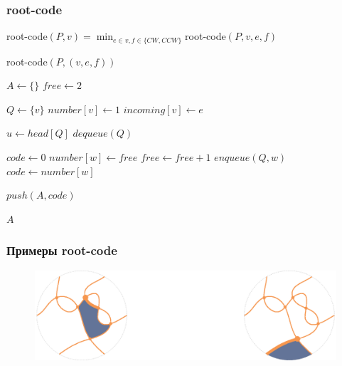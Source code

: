 \documentclass[dvips, intlimits, 9pt, unicode, notheorems, color=usenames,dvipsnames]{beamer}
\theoremstyle{plain}
\theoremstyle{definition}
\begin{document}
	\begin{frame}
		\frametitle{root-code}

		root-code$(P, v) = \min_{e \in v, f \in \{CW, CCW\} } $root-code$(P, v, e, f)$

		\begin{block}{root-code$(P, (v, e, f))$}
		{
			\footnotesize
			\begin{algorithmic}[H]
				\STATE $A \leftarrow \{\}$
				\STATE $free \leftarrow 2$

				\STATE $Q \leftarrow \{v\}$
				\STATE $number[v] \leftarrow 1$
				\STATE $incoming[v] \leftarrow e$

					\STATE $u \leftarrow head[Q]$
					\STATE $dequeue(Q)$

							\STATE $code \leftarrow 0$
						\ELSE
								\STATE $number[w] \leftarrow free$
								\STATE $free \leftarrow free + 1$
								\STATE $enqueue(Q, w)$
							\ENDIF
							\STATE $code \leftarrow number[w]$
						\ENDIF

						\STATE $push(A, code)$
					\ENDFOR
				\ENDWHILE

				\RETURN $A$
			\end{algorithmic}
		}
		\end{block}
	\end{frame}

	\begin{frame}
		\frametitle{Примеры root-code}

		\begin{figure}[ht]
			\centering
			\includegraphics[scale = 0.5]{c/rcode-example.eps}
		\end{figure}
	\end{frame}
\end{document}

